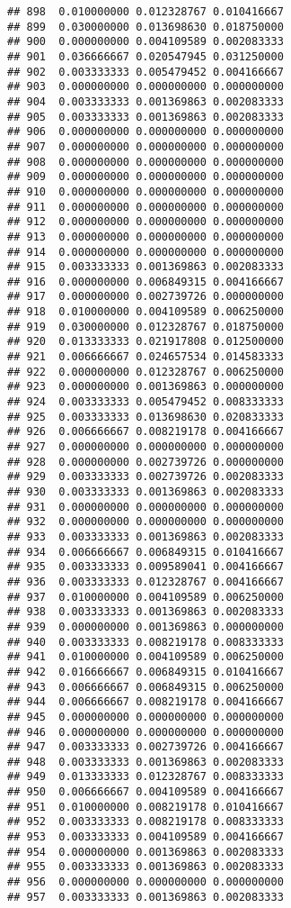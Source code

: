 \documentclass[
]{article}
\begin{document}
\begin{verbatim}
## 898  0.010000000 0.012328767 0.010416667
## 899  0.030000000 0.013698630 0.018750000
## 900  0.000000000 0.004109589 0.002083333
## 901  0.036666667 0.020547945 0.031250000
## 902  0.003333333 0.005479452 0.004166667
## 903  0.000000000 0.000000000 0.000000000
## 904  0.003333333 0.001369863 0.002083333
## 905  0.003333333 0.001369863 0.002083333
## 906  0.000000000 0.000000000 0.000000000
## 907  0.000000000 0.000000000 0.000000000
## 908  0.000000000 0.000000000 0.000000000
## 909  0.000000000 0.000000000 0.000000000
## 910  0.000000000 0.000000000 0.000000000
## 911  0.000000000 0.000000000 0.000000000
## 912  0.000000000 0.000000000 0.000000000
## 913  0.000000000 0.000000000 0.000000000
## 914  0.000000000 0.000000000 0.000000000
## 915  0.003333333 0.001369863 0.002083333
## 916  0.000000000 0.006849315 0.004166667
## 917  0.000000000 0.002739726 0.000000000
## 918  0.010000000 0.004109589 0.006250000
## 919  0.030000000 0.012328767 0.018750000
## 920  0.013333333 0.021917808 0.012500000
## 921  0.006666667 0.024657534 0.014583333
## 922  0.000000000 0.012328767 0.006250000
## 923  0.000000000 0.001369863 0.000000000
## 924  0.003333333 0.005479452 0.008333333
## 925  0.003333333 0.013698630 0.020833333
## 926  0.006666667 0.008219178 0.004166667
## 927  0.000000000 0.000000000 0.000000000
## 928  0.000000000 0.002739726 0.000000000
## 929  0.003333333 0.002739726 0.002083333
## 930  0.003333333 0.001369863 0.002083333
## 931  0.000000000 0.000000000 0.000000000
## 932  0.000000000 0.000000000 0.000000000
## 933  0.003333333 0.001369863 0.002083333
## 934  0.006666667 0.006849315 0.010416667
## 935  0.003333333 0.009589041 0.004166667
## 936  0.003333333 0.012328767 0.004166667
## 937  0.010000000 0.004109589 0.006250000
## 938  0.003333333 0.001369863 0.002083333
## 939  0.000000000 0.001369863 0.000000000
## 940  0.003333333 0.008219178 0.008333333
## 941  0.010000000 0.004109589 0.006250000
## 942  0.016666667 0.006849315 0.010416667
## 943  0.006666667 0.006849315 0.006250000
## 944  0.006666667 0.008219178 0.004166667
## 945  0.000000000 0.000000000 0.000000000
## 946  0.000000000 0.000000000 0.000000000
## 947  0.003333333 0.002739726 0.004166667
## 948  0.003333333 0.001369863 0.002083333
## 949  0.013333333 0.012328767 0.008333333
## 950  0.006666667 0.004109589 0.004166667
## 951  0.010000000 0.008219178 0.010416667
## 952  0.003333333 0.008219178 0.008333333
## 953  0.003333333 0.004109589 0.004166667
## 954  0.000000000 0.001369863 0.002083333
## 955  0.003333333 0.001369863 0.002083333
## 956  0.000000000 0.000000000 0.000000000
## 957  0.003333333 0.001369863 0.002083333

\end{verbatim}
\end{document}
